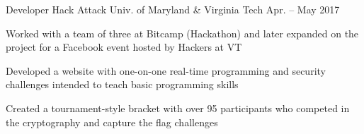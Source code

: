 

\begin{cventries}

  \cventry
    {Developer} %
    {Hack Attack} %
    {Univ. of Maryland \& Virginia Tech} %
    {Apr. – May 2017} %
    {
      \begin{cvitems} %
      \item {Worked with a team of three at Bitcamp (Hackathon) and later expanded on the project for a Facebook event hosted by Hackers at VT}
      \item {Developed a website with one-on-one real-time programming and security challenges intended to teach basic programming skills}
      \item {Created a tournament-style bracket with over 95 participants who competed in the cryptography and capture the flag challenges}
      \end{cvitems}
    }

\end{cventries}
